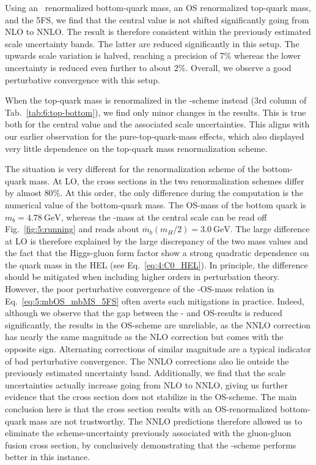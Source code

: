 Using an \MS\ renormalized bottom-quark mass, an \acs{OS} renormalized top-quark mass, and the 5\acs{FS}, we find that the central value is not shifted significantly going from \acs{NLO} to \acs{NNLO}. The result is therefore consistent within the previously estimated scale uncertainty bands. The latter are reduced significantly in this setup. The upwards scale variation is halved, reaching a precision of $7\%$ whereas the lower uncertainty is reduced even further to about $2\%$. Overall, we observe a good perturbative convergence with this setup.

When the top-quark mass is renormalized in the \MS-scheme instead (3rd column of Tab.~\ref{tab:6:top-bottom}), we find only minor changes in the results. This is true both for the central value and the associated scale uncertainties. This aligns with our earlier observation for the pure-top-quark-mass effects, which also displayed very little dependence on the top-quark mass renormalization scheme.

The situation is very different for the renormalization scheme of the bottom-quark mass. At \acs{LO}, the cross sections in the two renormalization schemes differ by almost $80\%$. At this order, the only difference during the computation is the numerical value of the bottom-quark mass. The \acs{OS}-mass of the bottom quark is $m_b = 4.78\ \text{GeV}$, whereas the \MS-mass at the central scale can be read off Fig.~\ref{fig:5:running} and reads about $\overline{m}_b(m_H/2) = 3.0\ \text{GeV}$. The large difference at \acs{LO} is therefore explained by the large discrepancy of the two mass values and the fact that the Higgs-gluon form factor show a strong quadratic dependence on the quark mass in the \acs{HEL} (see Eq.~\eqref{eq:4:C0_HEL}). In principle, the difference should be mitigated when including higher orders in perturbation theory. However, the poor perturbative convergence of the \MS-\acs{OS}-mass relation in Eq.~\eqref{eq:5:mbOS_mbMS_5FS} often averts such mitigations in practice. Indeed, although we observe that the gap between the \MS- and \acs{OS}-results is reduced significantly, the results in the \acs{OS}-scheme are unreliable, as the \acs{NNLO} correction has nearly the same magnitude as the \acs{NLO} correction but comes with the opposite sign. Alternating corrections of similar magnitude are a typical indicator of bad perturbative convergence. The \acs{NNLO} corrections also lie outside the previously estimated uncertainty band. Additionally, we find that the scale uncertainties actually increase going from \acs{NLO} to \acs{NNLO}, giving us further evidence that the cross section does not stabilize in the \acs{OS}-scheme. The main conclusion here is that the cross section results with an \acs{OS}-renormalized bottom-quark mass are not trustworthy. The \acs{NNLO} predictions therefore allowed us to eliminate the scheme-uncertainty previously associated with the gluon-gluon fusion cross section, by conclusively demonstrating that the \MS-scheme performs better in this instance.

